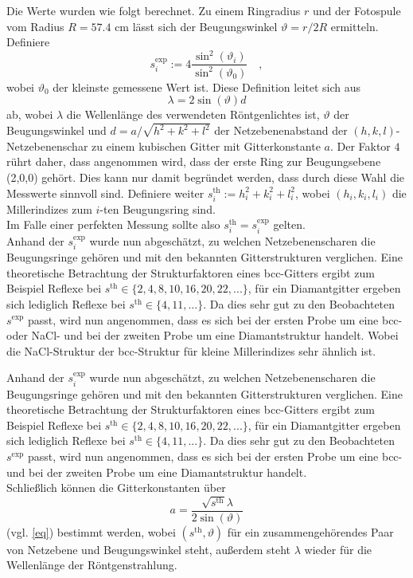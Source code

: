 Die Werte wurden wie folgt berechnet. Zu einem Ringradius $r$ und der Fotospule vom
Radius $R=57.4 \text{ cm}$ lässt sich der Beugungswinkel $\vartheta=r/2R$ ermitteln.
Definiere
\begin{equation}
s_i^\text{exp}:=4 \frac{\sin^2(\vartheta_i)}{\sin^2(\vartheta_0)} \quad ,
\end{equation}
wobei $\vartheta_0$ der kleinste gemessene Wert ist. Diese Definition leitet sich
aus
\begin{equation}
\lambda=2\sin(\vartheta) d \label{eq}
\end{equation}
ab, wobei $\lambda$ die Wellenlänge des verwendeten Röntgenlichtes ist, $\vartheta$ der Beugungswinkel und $d=a/\sqrt{h^2+k^2+l^2}$ der Netzebenenabstand der $(h,k,l)$-
Netzebenenschar zu einem kubischen Gitter mit Gitterkonstante $a$. Der Faktor $4$ rührt daher, dass angenommen wird, dass der erste Ring zur
Beugungsebene (2,0,0) gehört. Dies kann nur damit begründet werden, dass durch diese
Wahl die Messwerte sinnvoll sind.
Definiere weiter $s^\text{th}_i:=h_i^2+k_i^2+l_i^2$, wobei $(h_i,k_i,l_i)$ die
Millerindizes zum $i$-ten Beugungsring sind.\\
Im Falle einer perfekten Messung sollte also $s_i^\text{th}=s_i^\text{exp}$ gelten.
\\

Anhand der $s_i^\text{exp}$ wurde nun abgeschätzt, zu welchen Netzebenenscharen die
Beugungsringe gehören und mit den bekannten Gitterstrukturen verglichen. Eine
theoretische Betrachtung der Strukturfaktoren eines bcc-Gitters ergibt zum Beispiel
Reflexe bei $s^\text{th} \in \{ 2,4,8,10,16,20,22,... \}$, für ein Diamantgitter
ergeben sich lediglich Reflexe bei $s^\text{th}\in \{ 4,11,... \}$. Da dies sehr gut
zu den Beobachteten $s^\text{exp}$ passt, wird nun angenommen, dass es sich bei der
ersten Probe um eine bcc- oder NaCl- und bei der zweiten Probe um eine
Diamantstruktur handelt. Wobei die NaCl-Struktur der bcc-Struktur für kleine
Millerindizes sehr ähnlich ist.

Anhand der $s_i^\text{exp}$ wurde nun abgeschätzt, zu welchen Netzebenenscharen die
Beugungsringe gehören und mit den bekannten Gitterstrukturen verglichen. Eine
theoretische Betrachtung der Strukturfaktoren eines bcc-Gitters ergibt zum Beispiel
Reflexe bei $s^\text{th} \in \{ 2,4,8,10,16,20,22,... \}$, für ein Diamantgitter
ergeben sich lediglich Reflexe bei $s^\text{th}\in \{ 4,11,... \}$. Da dies sehr gut
zu den Beobachteten $s^\text{exp}$ passt, wird nun angenommen, dass es sich bei der
ersten Probe um eine bcc- und bei der zweiten Probe um eine Diamantstruktur handelt.
\\
Schließlich können die Gitterkonstanten über
\begin{equation}
a=\frac{\sqrt{s^\text{th}} \lambda}{2 \sin(\vartheta)}
\end{equation}
(vgl. \eqref{eq}) bestimmt werden, wobei $(s^\text{th},\vartheta)$ für ein
zusammengehörendes Paar von Netzebene und Beugungswinkel steht, außerdem steht
$\lambda$ wieder für die Wellenlänge der Röntgenstrahlung.

